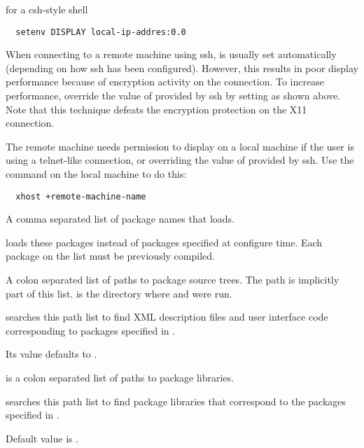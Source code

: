 \begin{description}
for a csh-style shell

\begin{verbatim}
  setenv DISPLAY local-ip-addres:0.0
\end{verbatim}

  When connecting to a remote machine using ssh,  is
  usually set automatically (depending on how ssh has been
  configured).  However, this results in poor display performance
  because of encryption activity on the connection.  To increase
  performance, override the value of  provided
  by ssh by setting   as
  shown above.  Note that this technique defeats the encryption
  protection on the X11 connection.
  
  The remote machine needs permission to display on a local machine if
  the user is using a telnet-like connection, or overriding the value
  of  provided by ssh.  Use the 
  command on the local machine to do this:

\begin{verbatim}
  xhost +remote-machine-name
\end{verbatim}
  
   A comma separated list of package names that
  \sr{} loads.
  
  \sr{} loads these packages instead of packages specified at
  configure time. Each package on the list must be previously
  compiled.
  
   A colon separated list of paths to
  package source trees.  The path
   is implicitly part of this
  list.   is the directory where
   and  were run.
  
  \sr{} searches this path list to find XML description files and
  user interface code corresponding to packages
  specified in .
  
  Its value defaults to .
  
    is a colon
  separated list of paths to package libraries.
  
  \sr{} searches this path list to find package libraries
  that correspond to the packages specified in
  .
  
  Default value is .

  
\end{description}

